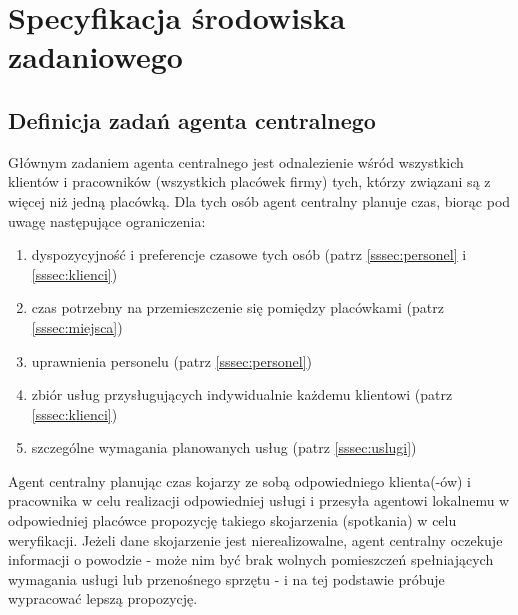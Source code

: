 ﻿\section{Specyfikacja środowiska zadaniowego}
%
%

\subsection{Definicja zadań agenta centralnego}\label{ssec:zadaniaCentralny}
Głównym zadaniem agenta centralnego jest odnalezienie wśród wszystkich klientów
i pracowników (wszystkich placówek firmy) tych, którzy związani są z więcej niż jedną placówką.
Dla tych osób agent centralny planuje czas, biorąc pod uwagę następujące ograniczenia:
\begin{enumerate}
	\item{dyspozycyjność i preferencje czasowe tych osób (patrz \ref{sssec:personel} i \ref{sssec:klienci})}
	\item{czas potrzebny na przemieszczenie się pomiędzy placówkami	(patrz \ref{sssec:miejsca})}
	\item{uprawnienia personelu (patrz \ref{sssec:personel})}
	\item{zbiór usług przysługujących indywidualnie każdemu klientowi (patrz \ref{sssec:klienci})}
	\item{szczególne wymagania planowanych usług (patrz \ref{sssec:uslugi})}
\end{enumerate}
Agent centralny planując czas kojarzy ze sobą odpowiedniego klienta(-ów) i pracownika w celu
realizacji odpowiedniej usługi i przesyła agentowi lokalnemu w odpowiedniej placówce propozycję
takiego skojarzenia (spotkania) w celu weryfikacji. Jeżeli dane skojarzenie jest nierealizowalne,
agent centralny oczekuje informacji o powodzie - może nim być brak wolnych pomieszczeń spełniających
wymagania usługi lub przenośnego sprzętu - i na tej podstawie próbuje wypracować lepszą propozycję.

